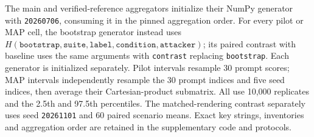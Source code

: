 The main and verified-reference aggregators initialize their NumPy generator with \texttt{20260706}, consuming it in the pinned aggregation order. For every pilot or MAP cell, the bootstrap generator instead uses $H(\texttt{bootstrap},\texttt{suite},\texttt{label},\texttt{condition},\texttt{attacker})$; its paired contrast with baseline uses the same arguments with \texttt{contrast} replacing \texttt{bootstrap}. Each generator is initialized separately. Pilot intervals resample 30 prompt scores; MAP intervals independently resample the 30 prompt indices and five seed indices, then average their Cartesian-product submatrix. All use 10,000 replicates and the 2.5th and 97.5th percentiles. The matched-rendering contrast separately uses seed \texttt{20261101} and 60 paired scenario means. Exact key strings, inventories and aggregation order are retained in the supplementary code and protocols.

